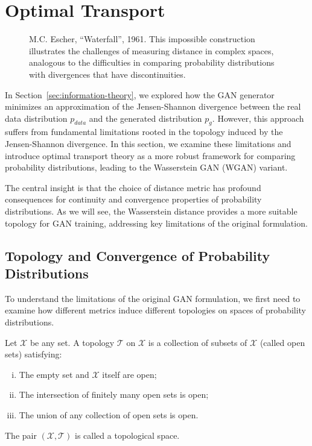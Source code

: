 \section{Optimal Transport}%
\label{sec:optimal-transport}
\vspace{0.5cm}
\begin{figure}[h!]%
  \label{fig:escher}
  \centering
  \caption{M.C. Escher, ``Waterfall'', 1961. This impossible construction illustrates the challenges of measuring distance in complex spaces, analogous to the difficulties in comparing probability distributions with divergences that have discontinuities.}
\end{figure}
\vspace{0.5cm}

In Section~\ref{sec:information-theory}, we explored how the GAN generator minimizes an approximation of the Jensen-Shannon divergence between the real data distribution $p_{data}$ and the generated distribution $p_g$. However, this approach suffers from fundamental limitations rooted in the topology induced by the Jensen-Shannon divergence. In this section, we examine these limitations and introduce optimal transport theory as a more robust framework for comparing probability distributions, leading to the Wasserstein GAN (WGAN) variant.

The central insight is that the choice of distance metric has profound consequences for continuity and convergence properties of probability distributions. As we will see, the Wasserstein distance provides a more suitable topology for GAN training, addressing key limitations of the original formulation.

\subsection{Topology and Convergence of Probability Distributions}

To understand the limitations of the original GAN formulation, we first need to examine how different metrics induce different topologies on spaces of probability distributions.

\begin{definition}%
  \label{def:topology1}
  Let $\mathcal{X}$ be any set. A \textnormal{\sffamily topology} $\mathcal{T}$ on $\mathcal{X}$ is a collection of subsets of $\mathcal{X}$ (called \textnormal{\sffamily open sets}) satisfying:
  \begin{enumerate}[(i)]
    \item The empty set and $\mathcal{X}$ itself are open;
    \item The intersection of finitely many open sets is open;
    \item The union of any collection of open sets is open.
  \end{enumerate}
  The pair $(\mathcal{X}, \mathcal{T})$ is called a \textnormal{\sffamily topological space}.
\end{definition}


